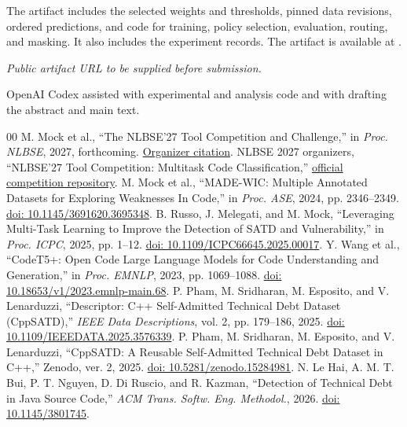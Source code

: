 \documentclass[10pt,conference]{IEEEtran}
\begin{document}
The artifact includes the selected weights and thresholds, pinned data revisions, ordered predictions, and code for training, policy selection, evaluation, routing, and masking. It also includes the experiment records.
\ifdefined\ArtifactURL
The artifact is available at \ArtifactURL.
\else

\noindent\textit{Public artifact URL to be supplied before submission.}
\fi

OpenAI Codex \cite{codex} assisted with experimental and analysis code and with drafting the abstract and main text.

\begin{thebibliography}{00}
 M. Mock et al., ``The NLBSE'27 Tool Competition and Challenge,'' in \emph{Proc. NLBSE}, 2027, forthcoming. \href{https://nlbse2027.github.io/tools/}{Organizer citation}.
 NLBSE 2027 organizers, ``NLBSE'27 Tool Competition: Multitask Code Classification,'' \href{https://github.com/nlbse2027/code-comment-classification}{official competition repository}.
 M. Mock et al., ``MADE-WIC: Multiple Annotated Datasets for Exploring Weaknesses In Code,'' in \emph{Proc. ASE}, 2024, pp. 2346--2349. \href{https://tore.tuhh.de/handle/11420/52816}{doi: \mbox{10.1145/3691620.3695348}}.
 B. Russo, J. Melegati, and M. Mock, ``Leveraging Multi-Task Learning to Improve the Detection of SATD and Vulnerability,'' in \emph{Proc. ICPC}, 2025, pp. 1--12. \href{https://arxiv.org/abs/2501.15934}{doi: \mbox{10.1109/ICPC66645.2025.00017}}.
 Y. Wang et al., ``CodeT5+: Open Code Large Language Models for Code Understanding and Generation,'' in \emph{Proc. EMNLP}, 2023, pp. 1069--1088. \href{https://aclanthology.org/2023.emnlp-main.68/}{doi: \mbox{10.18653/v1/2023.emnlp-main.68}}.
 P. Pham, M. Sridharan, M. Esposito, and V. Lenarduzzi, ``Descriptor: C++ Self-Admitted Technical Debt Dataset (CppSATD),'' \emph{IEEE Data Descriptions}, vol. 2, pp. 179--186, 2025. \href{https://oulurepo.oulu.fi/handle/10024/56697}{doi: \mbox{10.1109/IEEEDATA.2025.3576339}}.
 P. Pham, M. Sridharan, M. Esposito, and V. Lenarduzzi, ``CppSATD: A Reusable Self-Admitted Technical Debt Dataset in C++,'' Zenodo, ver. 2, 2025. \href{https://zenodo.org/records/15284981}{doi: \mbox{10.5281/zenodo.15284981}}.
 N. Le Hai, A. M. T. Bui, P. T. Nguyen, D. Di Ruscio, and R. Kazman, ``Detection of Technical Debt in Java Source Code,'' \emph{ACM Trans. Softw. Eng. Methodol.}, 2026. \href{https://zenodo.org/records/22899655}{doi: \mbox{10.1145/3801745}}.

\end{thebibliography}
\end{document}
